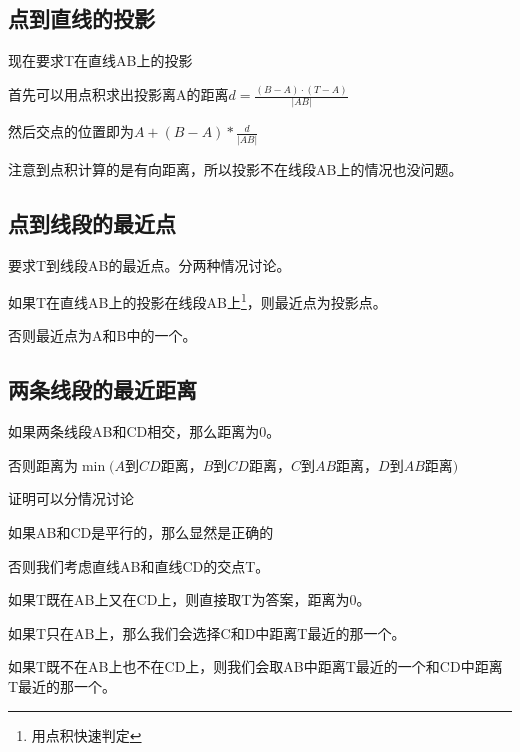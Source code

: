 \subsection{点到直线的投影}
\begin{frame}
\pause
现在要求T在直线AB上的投影

\pause
首先可以用点积求出投影离A的距离$d=\frac{ (B-A) \cdot (T-A) }{ |AB| }$

\pause
然后交点的位置即为$A+(B-A)*\frac{d}{|AB|}$

\pause
注意到点积计算的是有向距离，所以投影不在线段AB上的情况也没问题。
\end{frame}

\subsection{点到线段的最近点}
\begin{frame}
\pause
要求T到线段AB的最近点。分两种情况讨论。

\pause
如果T在直线AB上的投影在线段AB上\footnote{用点积快速判定}，则最近点为投影点。

\pause
否则最近点为A和B中的一个。
\end{frame}

\subsection{两条线段的最近距离}
\begin{frame}
\pause
如果两条线段AB和CD相交，那么距离为0。

否则距离为$\min(A$到$CD$距离，$B$到$CD$距离，$C$到$AB$距离，$D$到$AB$距离$)$ \newline \newline

\pause
证明可以分情况讨论

\pause
如果AB和CD是平行的，那么显然是正确的

\pause
否则我们考虑直线AB和直线CD的交点T。

\pause
如果T既在AB上又在CD上，则直接取T为答案，距离为0。

如果T只在AB上，那么我们会选择C和D中距离T最近的那一个。

如果T既不在AB上也不在CD上，则我们会取AB中距离T最近的一个和CD中距离T最近的那一个。
\end{frame}
